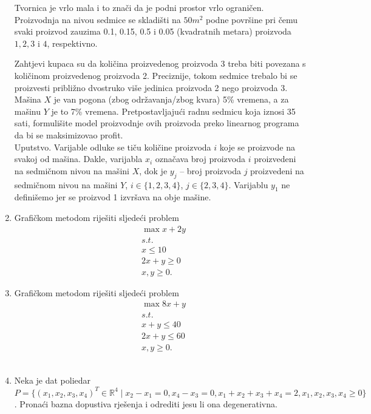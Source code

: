 \documentclass[a4paper, utf8, 11pt, colorlinks]{book}
\begin{document}
\begin{enumerate}
Tvornica je vrlo mala i to znači da je podni prostor vrlo ograničen. Proizvodnja na nivou sedmice se skladišti na $50 m^2$ podne površine pri čemu svaki proizvod zauzima 0.1, 0.15, 0.5 i 0.05 (kvadratnih metara) proizvoda $1, 2, 3$ i $4$,  respektivno. 

Zahtjevi kupaca su da količina proizvedenog proizvoda 3 treba biti povezana s količinom proizvedenog proizvoda 2. Preciznije, tokom sedmice trebalo bi se proizvesti približno dvostruko više jedinica proizvoda 2 nego proizvoda 3. Mašina $X$ je van pogona (zbog održavanja/zbog kvara) 5\% vremena, a za mašinu $Y$ je to 7\% vremena.
Pretpostavljajući radnu sedmicu koja iznosi 35 sati, formulišite model proizvodnje ovih proizvoda preko linearnog programa da bi se maksimizovao profit. \\

Uputstvo. Varijable odluke se tiču količine proizvoda $i$ koje se proizvode na svakoj od mašina.  Dakle, 
varijabla $x_i$ označava broj proizvoda $i$ proizvedeni na sedmičnom nivou na mašini $X$, dok je $y_j$ --   broj proizvoda $j$ proizvedeni na sedmičnom nivou na mašini $Y$, $i \in \{1,2,3,4\}$, $j \in \{2,3,4\}$. Varijablu $y_1$ ne definišemo jer se proizvod 1 izvršava na obje mašine.  

	\item Grafičkom metodom riješiti sljedeći problem
	\begin{align*}
		&\max   x + 2 y \\
		& s.t. \\
		& x \leq 10 \\
		& 2 x + y\geq 0 \\
		& x,y \geq 0.
	\end{align*}
	\item Grafičkom metodom riješiti sljedeći problem 
	\begin{align*}
		& \max  8 x + y \\
		& s.t. \\
		&  x + y \leq 40 \\
		& 2x + y \leq 60 \\
		& x,y \geq 0.
	\end{align*}
\\

\item Neka je dat poliedar $P= \{ (x_1,x_2,x_3, x_4)^T \in \mathbb{R}^4 \mid x_2 - x_1 = 0, x_4 - x_3 = 0,  x_1 + x_2 +   x_3 + x_4 = 2, x_1,x_2,x_3, x_4 \geq 0 \}$.  Pronaći bazna dopustiva rješenja i odrediti jesu li ona degenerativna.  
  
\end{enumerate}
\end{document}
